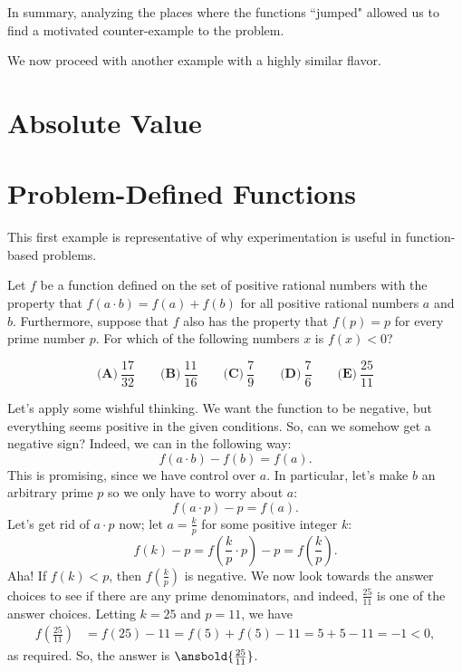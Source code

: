 \documentclass[mast]{lucky}
\begin{document}
\bigskip

In summary, analyzing the places where the functions ``jumped" allowed us to find a motivated counter-example to the problem.  

We now proceed with another example with a highly similar flavor.

\section{Absolute Value}

\section{Problem-Defined Functions}

This first example is representative of why experimentation is useful in function-based problems. 

\begin{exam}[2021 AMC 10A/18]
Let $f$ be a function defined on the set of positive rational numbers with the property that $f(a\cdot b)=f(a)+f(b)$ for all positive rational numbers $a$ and $b$. Furthermore, suppose that $f$ also has the property that $f(p)=p$ for every prime number $p$. For which of the following numbers $x$ is $f(x)<0$?

$$\textbf{(A)} ~\frac{17}{32}\qquad\textbf{(B)} ~\frac{11}{16}\qquad\textbf{(C)} ~\frac{7}{9}\qquad\textbf{(D)} ~\frac{7}{6} \qquad\textbf{(E)} ~\frac{25}{11}$$
\end{exam}

\begin{sol}
Let's apply some wishful thinking. We want the function to be negative, but everything seems positive in the given conditions. So, can we somehow get a negative sign? Indeed, we can in the following way:
 \[ f(a \cdot b) - f(b) = f(a). \]
This is promising, since we have control over $a$. In particular, let's make $b$ an arbitrary prime $p$ so we only have to worry about $a$:
 \[ f(a \cdot p) - p = f(a). \]
Let's get rid of $a \cdot p$ now; let $a = \frac{k}{p}$ for some positive integer $k$:
 \[ f(k) - p = f\left( \frac{k}{p}\cdot p\right) - p = f\left(\frac{k}{p}\right). \]
Aha! If $f(k) < p$, then $f\left(\frac{k}{p}\right)$ is negative. We now look towards the answer choices to see if there are any prime denominators, and indeed, $\frac{25}{11}$ is one of the answer choices. Letting $k = 25$ and $p = 11$, we have
\begin{align*}
f\left(\frac{25}{11}\right) &= f(25) - 11 = f(5) + f(5) - 11 = 5 + 5 - 11 = -1 < 0,
\end{align*}
as required. So, the answer is $\ansbold{\frac{25}{11}}$.
\end{sol}
\end{document}
